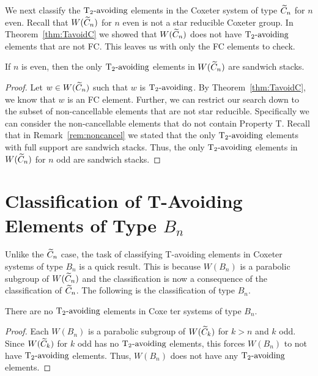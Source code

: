 We next classify the $\operatorname{T_2-\mathrm{avoiding}}$ elements in the Coxeter system of type $\widetilde{C}_n$ for $n$ even. Recall that $W(\widetilde{C}_n)$ for $n$ even is not a star reducible Coxeter group. In Theorem~\ref{thm:TavoidC} we showed that $W(\widetilde{C}_n)$ does not have $\operatorname{T_2-\mathrm{avoiding}}$ elements that are not FC. This leaves us with only the FC elements to check.

\begin{theorem}
	If $n$ is even, then the only $\operatorname{T_2-\mathrm{avoiding}}$ elements in $W(\widetilde{C}_n)$ are sandwich stacks.
	\begin{proof}
		Let $w \in W(\widetilde{C}_n)$ such that $w$ is $\operatorname{T_2-\mathrm{avoiding}}$. By Theorem~\ref{thm:TavoidC}, we know that $w$ is an FC element. Further, we can restrict our search down to the subset of non-cancellable elements that are not star reducible. Specifically we can consider the non-cancellable elements that do not contain Property T. Recall that in Remark~\ref{rem:noncancel} we stated that the only $\operatorname{T_2-\mathrm{avoiding}}$ elements with full support are sandwich stacks. Thus, the only $\operatorname{T_2-\mathrm{avoiding}}$ elements in $W(\widetilde{C}_n)$ for $n$ odd are sandwich stacks.
	\end{proof}
\end{theorem}

\section{Classification of T-Avoiding Elements of Type $B_n$}

Unlike the $\widetilde{C}_n$ case, the task of classifying T-avoiding elements in Coxeter systems of type $B_n$ is a quick result. This is because $W(B_n)$ is a parabolic subgroup of $W(\widetilde{C}_n)$ and the classification is now a consequence of the classification of $\widetilde{C}_n$. The following is the classification of type $B_n$.

\begin{theorem}
There are no $\operatorname{T_2-\mathrm{avoiding}}$ elements in Coxe	ter systems of type $B_n$.
\begin{proof}
	Each $W(B_n)$ is a parabolic subgroup of $W(\widetilde{C}_k)$ for $k >n$ and $k$ odd. Since $W(\widetilde{C}_k)$ for $k$ odd has no $\operatorname{T_2-\mathrm{avoiding}}$ elements, this forces $W(B_n)$ to not have $\operatorname{T_2-\mathrm{avoiding}}$ elements. Thus, $W(B_n)$ does not have any $\operatorname{T_2-\mathrm{avoiding}}$ elements.
\end{proof}

\end{theorem}
   